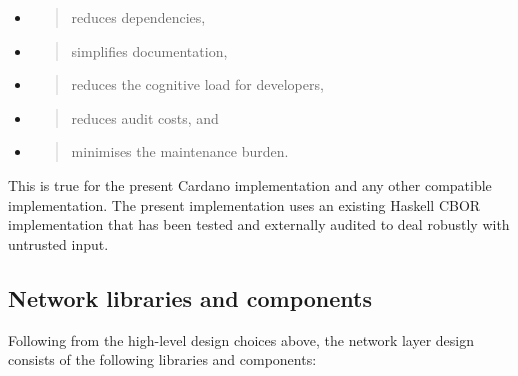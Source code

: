 \documentclass[11pt,a4paper]{article}
\begin{document}
\begin{itemize}
\item
  \begin{quote}
  reduces dependencies,
  \end{quote}
\item
  \begin{quote}
  simplifies documentation,
  \end{quote}
\item
  \begin{quote}
  reduces the cognitive load for developers,
  \end{quote}
\item
  \begin{quote}
  reduces audit costs, and
  \end{quote}
\item
  \begin{quote}
  minimises the maintenance burden.
  \end{quote}
\end{itemize}

This is true for the present Cardano implementation and any other
compatible implementation. The present implementation uses an existing
Haskell CBOR implementation that has been tested and externally audited
to deal robustly with untrusted input.

\subsection{Network libraries and components}
\label{network-libraries-and-components}

Following from the high-level design choices above, the network layer
design consists of the following libraries and components:
\end{document}
